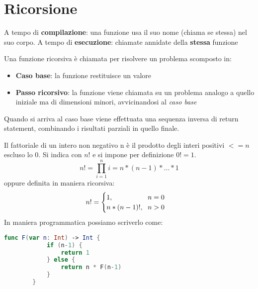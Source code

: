 \newpage
\section{Ricorsione}
\begin{definition}[Ricorsione]
	A tempo di \textbf{compilazione}: una funzione usa il suo nome (chiama se stessa) nel suo corpo.
	A tempo di \textbf{esecuzione}: chiamate annidate della \textbf{stessa} funzione
\end{definition}
\noindent Una funzione ricorsiva è chiamata per risolvere un problema scomposto in:
\begin{itemize}
	\item \textbf{Caso base}: la funzione restituisce un valore
	\item \textbf{Passo ricorsivo}: la funzione viene chiamata su un problema analogo a quello iniziale ma di dimensioni minori, avvicinandosi al \emph{caso base}
\end{itemize}
Quando si  arriva al caso base viene effettuata una sequenza inversa di return statement, combinando i risultati parziali in quello finale.
\begin{example}[Fattoriale]
	Il fattoriale di un intero non negativo n è il prodotto
	degli interi positivi $<= n$ escluso lo $0$. Si indica con
	$n!$ e si impone per definizione $0! = 1$.
	\begin{equation}
		n! = \prod_{i=1}^{n} i=n*(n-1)*\ldots*1
	\end{equation}
	oppure definita in maniera ricorsiva:
	\begin{equation}
		n! = \begin{cases}
			1, \hspace{50px} n=0 \\
			n*(n-1)!, \hspace{6px} n>0
		\end{cases}
	\end{equation}
	In maniera programmatica possiamo scriverlo come:
	\begin{lstlisting}[language=Swift, caption=Fattoriale con ricorsione, mathescape=true]
		func F(var n: Int) -> Int {
			if (n-1) {
				return 1
			} else {
				return n * F(n-1)
			}
		}
	\end{lstlisting}
\end{example}

